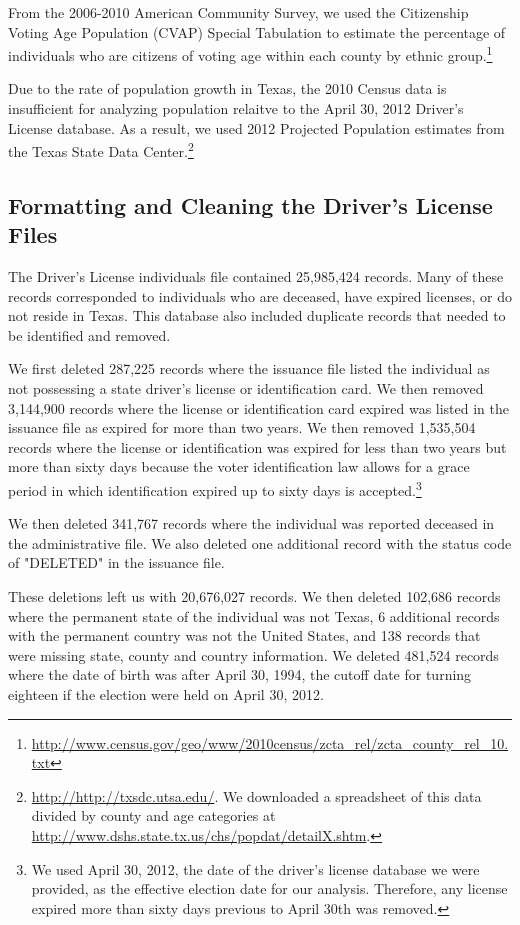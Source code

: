 \documentclass[12pt]{article}
\begin{document}
From the 2006-2010 American Community Survey, we used the Citizenship Voting Age Population (CVAP) Special Tabulation to estimate the percentage of individuals who are citizens of voting age within each county by ethnic group.\footnote{\url{http://www.census.gov/geo/www/2010census/zcta_rel/zcta_county_rel_10.txt}}

Due to the rate of population growth in Texas, the 2010 Census data is
insufficient for analyzing population relaitve to the April 30, 2012
Driver's License database.  As a result, we used 2012 Projected
Population estimates from the Texas State Data
Center.\footnote{\url{http://http://txsdc.utsa.edu/}.  We downloaded a
  spreadsheet of this data divided by county and age categories at
  \url{http://www.dshs.state.tx.us/chs/popdat/detailX.shtm}.}

\subsection{Formatting and Cleaning the Driver's License Files}
The Driver's License individuals file contained 25,985,424 records.
Many of these records corresponded to individuals who are deceased,
have expired licenses, or do not reside in Texas.  This database also
included duplicate records that needed to be identified and removed.

We first deleted 287,225 records where the issuance file listed the
individual as not possessing a state driver's license or
identification card.  We then removed 3,144,900 records where the
license or identification card expired was listed in the issuance file
as expired for more than two years.  We then removed 1,535,504 records
where the license or identification was expired for less than two
years but more than sixty days because the voter identification law
allows for a grace period in which identification expired up to sixty
days is accepted.\footnote{We used April 30, 2012, the date of the
  driver's license database we were provided, as the effective election
  date for our analysis.  Therefore, any license expired more than
  sixty days previous to April 30th was removed.}

We then deleted 341,767 records where the individual was reported
deceased in the administrative file.  We also deleted one additional
record with the status code of "DELETED" in the issuance file.

These deletions left us with 20,676,027 records.  We then deleted
102,686 records where the permanent state of the individual was not
Texas, 6 additional records with the permanent country was not the
United States, and 138 records that were missing state, county and
country information.  We deleted 481,524 records where the date of
birth was after April 30, 1994, the cutoff date for turning eighteen
if the election were held on April 30, 2012.
\end{document}
